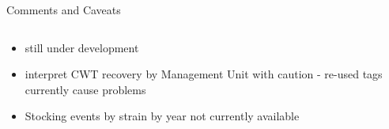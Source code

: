 \documentclass[presentation, smaller]{beamer}
\begin{document}
\begin{frame}[label=sec-4]{Comments and Caveats}
\begin{columns}
\begin{column}{0.4\textwidth}

\begin{itemize}
\item still under development
\item interpret CWT recovery by Management Unit with caution - re-used
tags currently cause problems
\item Stocking events by strain by year not currently available
\end{itemize}
\end{column}

\begin{column}{0.6\textwidth}
\end{column}
\end{columns}
\end{frame}
\end{document}
